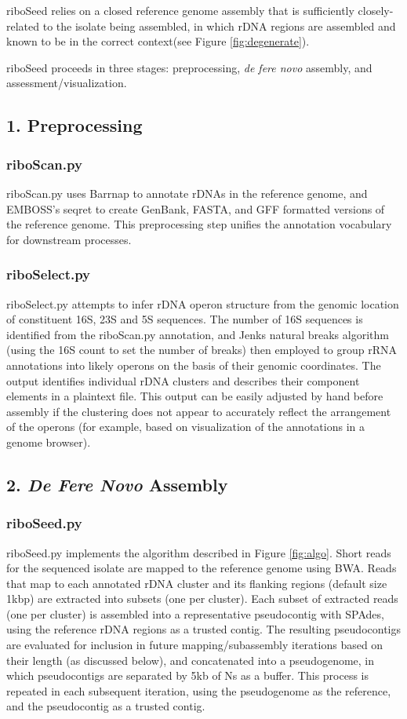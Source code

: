 \documentclass[10pt]{article}
\begin{document}
\begin{linenumbers}
riboSeed relies on a closed reference genome assembly that is sufficiently closely-related to the isolate being assembled, in which rDNA regions are assembled and known to be in the correct context(see Figure \ref{fig:degenerate}).

riboSeed proceeds in three stages: preprocessing, \textit{de fere novo} assembly, and assessment/visualization.
\subsection*{1. Preprocessing}
\subsubsection*{riboScan.py}
riboScan.py uses Barrnap\cite{Seemann2014} to annotate rDNAs in the reference genome, and EMBOSS’s seqret\cite{Rice2000} to create GenBank, FASTA, and GFF formatted versions of the reference genome. This preprocessing step unifies the annotation vocabulary for downstream processes.

\subsubsection*{riboSelect.py}
riboSelect.py attempts to infer rDNA operon structure from the genomic location of constituent 16S, 23S and 5S sequences. The number of 16S sequences is identified from the riboScan.py annotation, and Jenks natural breaks algorithm (using the 16S count to set the number of breaks) then employed to group rRNA annotations into likely operons on the basis of  their genomic coordinates. The output identifies individual rDNA clusters and describes their component elements in a plaintext file. This output can be easily adjusted by hand before assembly if the clustering does not appear to accurately reflect the arrangement of the operons (for example, based on visualization of the annotations in a genome browser).

\subsection*{2. \textit{De Fere Novo} Assembly}
\subsubsection*{riboSeed.py}
riboSeed.py implements the algorithm described in Figure \ref{fig:algo}. Short reads for the sequenced isolate are mapped to the reference genome using BWA\cite{Li 2009}. Reads that map to each annotated rDNA cluster and its flanking regions (default size 1kbp) are extracted into subsets (one per cluster). Each subset of extracted reads (one per cluster) is assembled into a representative pseudocontig with SPAdes\cite{Bankevich2012}, using the reference rDNA regions as a trusted contig. The resulting pseudocontigs are evaluated for inclusion in future mapping/subassembly iterations based on their length (as discussed below), and concatenated into a pseudogenome, in which pseudocontigs are separated by 5kb of Ns as a buffer. This process is repeated in each subsequent iteration, using the pseudogenome as the reference, and the pseudocontig as a trusted contig.



\end{linenumbers}
\end{document}
